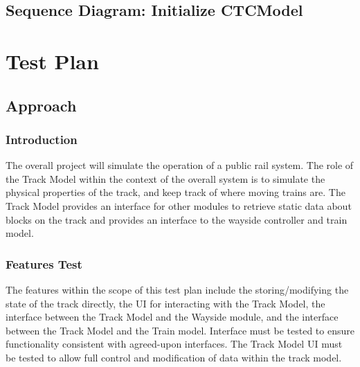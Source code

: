 \documentclass{scrreprt}
\begin{document}
\subsection{Sequence Diagram: Initialize CTCModel}
\begin{center}
\end{center}

\section{Test Plan}

\subsection{Approach}

\subsubsection{Introduction}
The overall project will simulate the operation of a public rail system. The role of the Track Model within the context of the overall system is to simulate the physical properties of the track, and keep track of where moving trains are. The Track Model provides an interface for other modules to retrieve static data about blocks on the track and provides an interface to the wayside controller and train model.

\subsubsection{Features Test}
The features within the scope of this test plan include the storing/modifying the state of the track directly, the UI for interacting with the Track Model, the interface between the Track Model and the Wayside module, and the interface between the Track Model and the Train model. Interface must be tested to ensure functionality consistent with agreed-upon interfaces. The Track Model UI must be tested to allow full control and modification of data within the track model.
\end{document}
